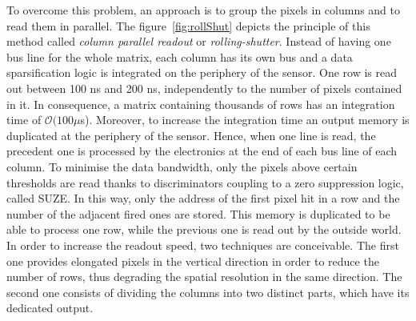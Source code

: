     To overcome this problem, an approach is to group the pixels in columns and to read them in parallel.
    The figure~\ref{fig:rollShut} depicts the principle of this method called \textit{column parallel readout} or \textit{rolling-shutter}.
    Instead of having one bus line for the whole matrix, each column has its own bus and a data sparsification logic is integrated on the periphery of the sensor.
    One row is read out between 100 ns and 200 ns, independently to the number of pixels contained in it.
    In consequence, a matrix containing thousands of rows has an integration time of $\mathcal{O}(100\mu$s).
    Moreover, to increase the integration time an output memory is duplicated at the periphery of the sensor.
    Hence, when one line is read, the precedent one is processed by the electronics at the end of each bus line of each column.
    To minimise the data bandwidth, only the pixels above certain thresholds are read thanks to discriminators coupling to a zero suppression logic, called \gls{SUZE}.
    In this way, only the address of the first pixel hit in a row and the number of the adjacent fired ones are stored.
    This memory is duplicated to be able to process one row, while the previous one is read out by the outside world.
    In order to increase the readout speed, two techniques are conceivable\cite{Winter:2009zz}.
    The first one provides elongated pixels in the vertical direction in order to reduce the number of rows, thus degrading the spatial resolution in the same direction.
    The second one consists of dividing the columns into two distinct parts, which have its dedicated output.



